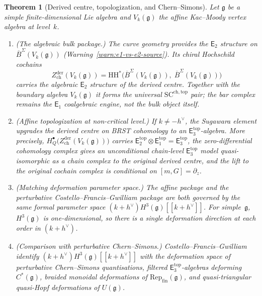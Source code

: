 \documentclass[11pt,reqno]{amsart}
\newtheorem{theorem}{Theorem}[section]
\theoremstyle{definition}
\theoremstyle{remark}
\newcommand{\HH}{\mathrm{HH}}
\newcommand{\Eone}{\mathsf{E}_{1}}
\newcommand{\Etwo}{\mathsf{E}_{2}}
\providecommand{\Ethree}{\mathsf{E}_{3}}
\newcommand{\fg}{\mathfrak{g}}
\newcommand{\BarSig}{\overline{B}^{\Sigma}}
\numberwithin{equation}{section}
\begin{document}
\begin{theorem}[Derived centre, topologization, and
Chern--Simons]
\label{thm:e3-cs}
Let $\fg$ be a simple finite-dimensional Lie algebra and
$V_k(\fg)$ the affine Kac--Moody vertex algebra at level~$k$.
\begin{enumerate}[label=\textup{(\roman*)}]
\item \textup{(The algebraic bulk package.)}
  The curve geometry provides the $\Etwo$ structure on
  $\BarSig(V_k(\fg))$
  \textup{(}Warning~\textup{\ref{warn:e1-vs-e2-source}}\textup{)}.
  Its chiral Hochschild cochains
  \begin{equation}\label{eq:e3-center}
    Z^{\mathrm{der}}_{\mathrm{ch}}(V_k(\fg))
    = \HH^*\bigl(\BarSig(V_k(\fg)),\;
    \BarSig(V_k(\fg))\bigr)
  \end{equation}
  carries the algebraic $\Etwo$ structure of the derived
  centre. Together with the boundary algebra $V_k(\fg)$ it
  forms the universal $\mathrm{SC}^{\mathrm{ch,top}}$ pair;
  the bar complex remains the $\Eone$ coalgebraic engine,
  not the bulk object itself.
\item \textup{(Affine topologization at non-critical level.)}
  If $k \neq -h^\vee$, the Sugawara element upgrades the
  derived centre on BRST cohomology to an
  $\Ethree^{\mathrm{top}}$-algebra. More precisely,
  $H_Q^\bullet\!\bigl(
  Z^{\mathrm{der}}_{\mathrm{ch}}(V_k(\fg))\bigr)$ carries
  $\Etwo^{\mathrm{top}} \otimes \Eone^{\mathrm{top}}
  = \Ethree^{\mathrm{top}}$, the
  zero-differential cohomology complex gives an
  unconditional chain-level $\Ethree^{\mathrm{top}}$ model
  quasi-isomorphic as a chain complex to the original
  derived centre, and the lift to the original cochain
  complex is conditional on $[m,G]=\partial_z$.
\item \textup{(Matching deformation parameter space.)}
  The affine package and the perturbative
  Costello--Francis--Gwilliam package are both governed by
  the same formal parameter space
  $(k+h^\vee) H^3(\fg)[[k+h^\vee]]$. For simple~$\fg$,
  $H^3(\fg)$ is one-dimensional, so there is a single
  deformation direction at each order in $(k+h^\vee)$.
\item \textup{(Comparison with perturbative
  Chern--Simons.)}
  Costello--Francis--Gwilliam~\cite{CFG26} identify
  $(k+h^\vee) H^3(\fg)[[k+h^\vee]]$ with the deformation
  space of perturbative Chern--Simons quantisations,
  filtered $\Ethree^{\mathrm{top}}$-algebras deforming
  $C^*(\fg)$, braided monoidal deformations of
  $\mathrm{Rep}_{\mathrm{fin}}(\fg)$, and
  quasi-triangular quasi-Hopf deformations of $U(\fg)$.

\end{enumerate}
\end{theorem}
\end{document}
